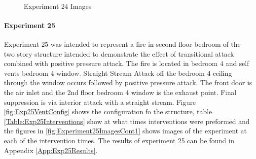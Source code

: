 \documentclass{article}
\begin{document}
\begin{figure}[H]
	\ContinuedFloat 
	\centering 
	 \ 
	\caption{Experiment 24 Images}
	\label{fig:Experiment24ImagesCont3} 
\end{figure}

\paragraph{Experiment 25}\mbox{}

Experiment 25 was intended to represent a fire in second floor bedroom of the two story structure intended to demonstrate the effect of transitional attack combined with positive pressure attack. The fire is located in bedroom 4 and self vents bedroom 4 window. Straight Stream Attack off the bedroom 4 ceiling through the window occurs followed by positive pressure attack. The front door is the air inlet and the 2nd floor bedroom 4 window is the exhaust point. Final suppression is via interior attack with a straight stream. Figure \ref{fig:Exp25VentConfig} shows the configuration fo the structure, table \ref{Table:Exp25Interventions} show at what times interventions were preformed and the figures in \ref{fig:Experiment25ImagesCont1} shows images of the experiment at each of the intervention times. The results of experiment 25 can be found in Appendix \ref{App:Exp25Results}.
\end{document}
